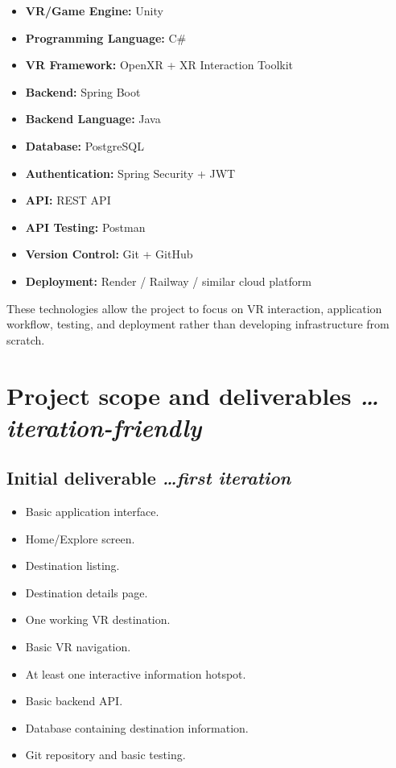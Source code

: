 \documentclass[11pt,a4paper]{article}
\newcommand{\BvrHint}[1]{%
  {\normalfont\normalsize\itshape\hfill #1}}
\begin{document}
\begin{itemize}[leftmargin=0.7cm]
    \item \textbf{VR/Game Engine:} Unity
    \item \textbf{Programming Language:} C\#
    \item \textbf{VR Framework:} OpenXR + XR Interaction Toolkit
    \item \textbf{Backend:} Spring Boot
    \item \textbf{Backend Language:} Java
    \item \textbf{Database:} PostgreSQL
    \item \textbf{Authentication:} Spring Security + JWT
    \item \textbf{API:} REST API
    \item \textbf{API Testing:} Postman
    \item \textbf{Version Control:} Git + GitHub
    \item \textbf{Deployment:} Render / Railway / similar cloud platform
\end{itemize}

These technologies allow the project to focus on VR interaction, application workflow, testing, and
deployment rather than developing infrastructure from scratch.

\section{Project scope and deliverables%
  \BvrHint{\ldots iteration-friendly}}

\subsection{Initial deliverable%
  \BvrHint{\ldots first iteration}}

\begin{itemize}[leftmargin=0.7cm]
    \item Basic application interface.
    \item Home/Explore screen.
    \item Destination listing.
    \item Destination details page.
    \item One working VR destination.
    \item Basic VR navigation.
    \item At least one interactive information hotspot.
    \item Basic backend API.
    \item Database containing destination information.
    \item Git repository and basic testing.
\end{itemize}
\end{document}
